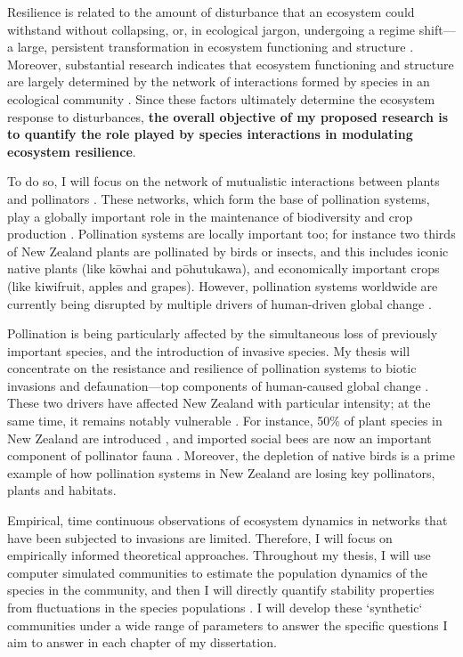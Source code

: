 \documentclass[a4paper]{article}
\begin{document}
Resilience is related to the amount of disturbance that an ecosystem could withstand without collapsing, or, in ecological jargon, undergoing a regime shift---a large, persistent transformation in ecosystem functioning and structure \autocite{Holling1973, Gunderson2000}.
Moreover, substantial research indicates that ecosystem functioning and structure are largely determined by the network of interactions formed by species in an ecological community \autocite{Bascompte2006, Dobson2006, Tylianakis2008, Reiss2009}.
Since these factors ultimately determine the ecosystem response to disturbances, \textbf{the overall objective of my proposed research is to quantify the role played by species interactions in modulating ecosystem resilience}.

To do so, I will focus on the network of mutualistic interactions between plants and pollinators \autocite{Bascompte2006, Bascompte2007, Klein2007}.
These networks, which form the base of pollination systems, play a globally important role in the maintenance of biodiversity and crop production \autocite{Bascompte2007, Klein2007}.
Pollination systems are locally important too; for instance two thirds of New Zealand plants are pollinated by birds or insects\autocite{Cox2000}, and this includes iconic native plants (like k\={o}whai and p\={o}hutukawa), and economically important crops (like kiwifruit, apples and grapes). However, pollination systems worldwide are currently being disrupted by multiple drivers of human-driven global change \autocite{Cox2000}.

Pollination is being particularly affected by the simultaneous loss of previously important species, and the introduction of invasive species.
My thesis will concentrate on the resistance and resilience of pollination systems to biotic invasions and defaunation---top components of human-caused global change \autocite{Loevei1997}.
These two drivers have affected New Zealand with particular intensity; at the same time, it remains notably vulnerable \autocite{Vitousek1997}.
For instance, 50\% of plant species in New Zealand are introduced \autocite{Wilton2000}, and imported social bees are now an important component of pollinator fauna \autocite{Lloyd1985, Newstrom2005}.
Moreover, the depletion of native birds \autocite{Anderson2003, Robertson2009} is a prime example of how pollination systems in New Zealand are losing key pollinators, plants and habitats\autocite{Cox2000}.

Empirical, time continuous observations of ecosystem dynamics in networks that have been subjected to invasions are limited.
Therefore, I will focus on empirically informed theoretical approaches.
Throughout my thesis, I will use computer simulated communities to estimate the population dynamics of the species in the community, and then I will directly quantify stability properties from fluctuations in the species populations \autocite{Bastolla2009, Garcia-Algarra2013}.
I will develop these `synthetic` communities under a wide range of parameters to answer the specific questions I aim to answer in each chapter of my dissertation.
\end{document}
